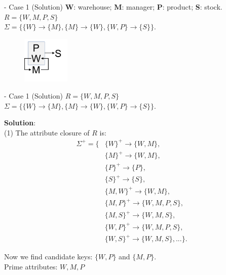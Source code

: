 \begin{frame}[fragile]{ - Case 1 (Solution)}
	\textbf{W}: warehouse; \textbf{M}: manager;
	\textbf{P}: product; \textbf{S}: stock.\\\vspace{5pt}
	$R = \{W, M, P, S\}$\\
	$\Sigma = \{\{W\} \rightarrow \{M\}, \{M\} \rightarrow \{W\},
	\{W, P\} \rightarrow \{S\}\}$.\\\vspace{15pt}
	\begin{figure}
		\includegraphics[width=0.2\textwidth, trim=0 0 0 0, clip]{t5/images/case1.png}
	\end{figure}\vspace{-5pt}
\end{frame}

\begin{frame}[fragile]{ - Case 1 (Solution)}
	$R = \{W, M, P, S\}$\\
	$\Sigma = \{\{W\} \rightarrow \{M\}, \{M\} \rightarrow \{W\},
	\{W, P\} \rightarrow \{S\}\}$.\\\vspace{5pt}
	
	\textbf{Solution}:\\
	(1) The attribute closure of $R$ is:
	\begin{align*} 
		\Sigma^{+} = \{&\{W\}^{+} \rightarrow \{W, M\},\\
		&\{M\}^{+} \rightarrow \{W, M\},\\
		&\{P\}^{+} \rightarrow \{P\},\\
		&\{S\}^{+} \rightarrow \{S\},\\
		&\{{M,W}\}^{+} \rightarrow \{W, M\},\\
		&\{{M,P}\}^{+} \rightarrow \{W, M, P, S\},\\
		&\{{M,S}\}^{+} \rightarrow \{W, M, S\},\\
		&\{{W,P}\}^{+} \rightarrow \{W, M, P, S\},\\
		&\{{W,S}\}^{+} \rightarrow \{W, M, S\},...\}.
	\end{align*} 
	
	Now we find candidate keys: $\{W, P\}$ and $\{M, P\}$.\\
	Prime attributes: $W, M, P$
\end{frame}

